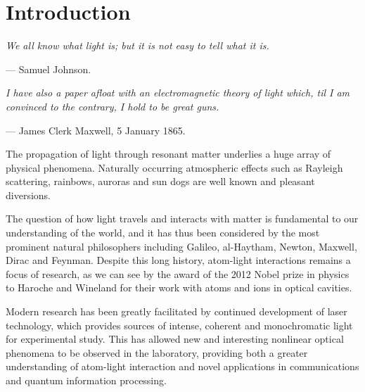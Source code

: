 \chapter[Introduction]
  {Introduction}
  \label{chp:intro}

  \begin{displayquote}
    \textit{We all \textrm{know} what light is; but it is not easy to \textrm{tell} what it is.}
    \begin{flushright}
      --- Samuel Johnson.
    \end{flushright}
  \end{displayquote} 

  \begin{displayquote}
  \textit{I have also a paper afloat with an electromagnetic theory of light which, til I am convinced to the contrary, I hold to be great guns.}\\
    \begin{flushright}
      --- James Clerk Maxwell, 5 January 1865.
    \end{flushright}
  \end{displayquote}


    The propagation of light through resonant matter underlies a huge array of
    physical phenomena. Naturally occurring atmospheric effects such as Rayleigh
    scattering, rainbows, auroras and sun dogs are well known and pleasant
    diversions.

    The question of how light travels and interacts with matter is fundamental
    to our understanding of the world, and it has thus been considered by the
    most prominent natural philosophers including Galileo, al-Haytham, Newton,
    Maxwell, Dirac and Feynman. Despite this long history, atom-light
    interactions remains a focus of research, as we can see by the award of the
    2012 Nobel prize in physics to Haroche and Wineland for their work with
    atoms and ions in optical cavities.\cite{Nobelprize.org}

    Modern research has been greatly facilitated by continued development of
    laser technology, which provides sources of intense, coherent and
    monochromatic light for experimental study. This has allowed new and
    interesting nonlinear optical phenomena to be observed in the laboratory,
    providing both a greater understanding of atom-light interaction and novel
    applications in communications\cite{Kimble2008} and quantum information processing\cite{Lvovsky2009}.

